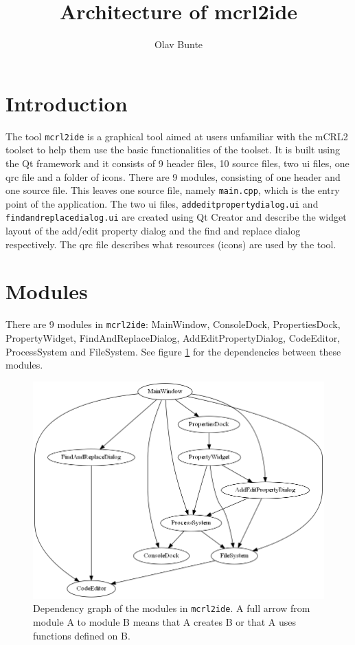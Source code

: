 \documentclass[a4paper, fleqn]{article}
\title{Architecture of mcrl2ide}
\author{Olav Bunte}
\begin{document}
\maketitle


\section{Introduction}
The tool \texttt{mcrl2ide} is a graphical tool aimed at users unfamiliar with the mCRL2 toolset to help them use the basic functionalities of the toolset. It is built using the Qt framework and it consists of 9 header files, 10 source files, two ui files, one qrc file and a folder of icons. There are 9 modules, consisting of one header and one source file. This leaves one source file, namely \texttt{main.cpp}, which is the entry point of the application. The two ui files, \texttt{addeditpropertydialog.ui} and \texttt{findandreplacedialog.ui} are created using Qt Creator and describe the widget layout of the add/edit property dialog and the find and replace dialog respectively. The qrc file describes what resources (icons) are used by the tool.


\section{Modules}
There are 9 modules in \texttt{mcrl2ide}: MainWindow, ConsoleDock, PropertiesDock, PropertyWidget, FindAndReplaceDialog, AddEditPropertyDialog, CodeEditor, ProcessSystem and FileSystem. See figure \ref{classdepgraph} for the dependencies between these modules.

\begin{figure}[t]
\includegraphics[width=\textwidth]{classDependencyGraph.png}
\caption{Dependency graph of the modules in \texttt{mcrl2ide}. A full arrow from module A to module B means that A creates B or that A uses functions defined on B.}
\label{classdepgraph}
\end{figure}
\end{document}
